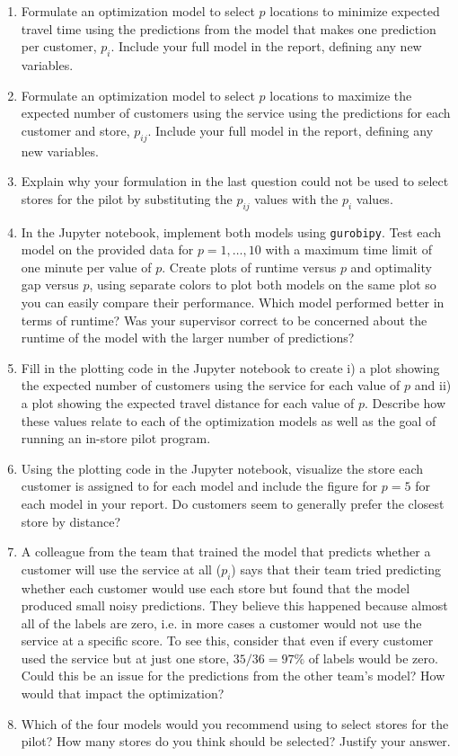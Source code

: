 \documentclass{article}
\begin{document}
\begin{enumerate}
    \item Formulate an optimization model to select $p$ locations to minimize expected travel time using the predictions from the model that makes one prediction per customer, $p_i$. Include your full model in the report, defining any new variables.
    
    \item Formulate an optimization model to select $p$ locations to maximize the expected number of customers using the service using the predictions for each customer and store, $p_{ij}$. Include your full model in the report, defining any new variables.

    \item Explain why your formulation in the last question could not be used to select stores for the pilot by substituting the $p_{ij}$ values with the $p_i$ values.
    
    \item In the Jupyter notebook, implement both models using \verb|gurobipy|. Test each model on the provided data for $p = 1, \ldots, 10$ with a maximum time limit of one minute per value of $p$. Create plots of runtime versus $p$ and optimality gap versus $p$, using separate colors to plot both models on the same plot so you can easily compare their performance. Which model performed better in terms of runtime? Was your supervisor correct to be concerned about the runtime of the model with the larger number of predictions? 
    
    \item Fill in the plotting code in the Jupyter notebook to create i) a plot showing the expected number of customers using the service for each value of $p$ and ii) a plot showing the expected travel distance for each value of $p$. Describe how these values relate to each of the optimization models as well as the goal of running an in-store pilot program.
    
    \item Using the plotting code in the Jupyter notebook, visualize the store each customer is assigned to for each model and include the figure for $p = 5$ for each model in your report. Do customers seem to generally prefer the closest store by distance?

    \item A colleague from the team that trained the model that predicts whether a customer will use the service at all ($p_i$) says that their team tried predicting whether each customer would use each store but found that the model produced small noisy predictions. They believe this happened because almost all of the labels are zero, i.e. in more cases a customer would not use the service at a specific score. To see this, consider that even if every customer used the service but at just one store, $35/36 = 97\%$ of labels would be zero. Could this be an issue for the predictions from the other team's model? How would that impact the optimization?
    
    \item Which of the four models would you recommend using to select stores for the pilot? How many stores do you think should be selected? Justify your answer. 

\end{enumerate}
\end{document}
